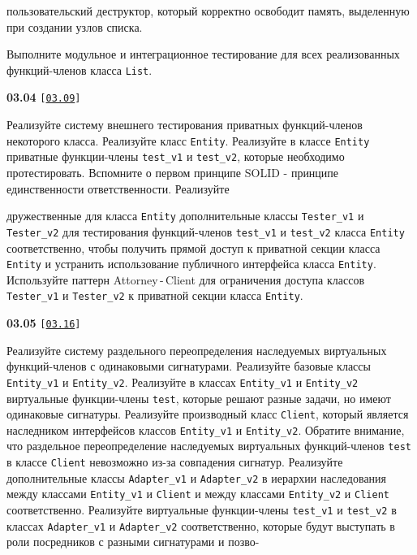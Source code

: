 \documentclass[a4paper,12pt]{article}
\begin{document}
пользовательский деструктор, который корректно освободит память, выделенную при создании узлов списка. 

Выполните модульное и интеграционное тестирование для всех реализованных функций-членов класса \lstinline{List}.

\bigskip

{\large \textbf{03.04} \texttt{[\href{https://github.com/i-s-m-mipt/Education/blob/master/projects/examples/source/03.09.cpp}{\texttt{03.09}}]}}

\bigskip

Реализуйте систему внешнего тестирования приватных функций-членов некоторого класса. Реализуйте класс \lstinline{Entity}. Реализуйте в классе \lstinline{Entity} приватные функции-члены \lstinline{test_v1} и \lstinline{test_v2}, которые необходимо протестировать. Вспомните о первом принципе SOLID - принципе единственности ответственности. Реализуйте 

дружественные для класса \lstinline{Entity} дополнительные классы \lstinline{Tester_v1} и \lstinline{Tester_v2} для тестирования функций-членов \lstinline{test_v1} и \lstinline{test_v2} класса \lstinline{Entity} соответственно, чтобы получить прямой доступ к приватной секции класса \lstinline{Entity} и устранить использование публичного интерфейса класса \lstinline{Entity}. Используйте паттерн Attorney\,-\,Client для ограничения доступа классов \lstinline{Tester_v1} и \lstinline{Tester_v2} к приватной секции класса \lstinline{Entity}.

\bigskip

{\large \textbf{03.05} \texttt{[\href{https://github.com/i-s-m-mipt/Education/blob/master/projects/examples/source/03.16.cpp}{\texttt{03.16}}]}}

\bigskip

Реализуйте систему раздельного переопределения наследуемых виртуальных функций-членов с одинаковыми сигнатурами. Реализуйте базовые классы \lstinline{Entity_v1} и \lstinline{Entity_v2}. Реализуйте в классах \lstinline{Entity_v1} и \lstinline{Entity_v2} виртуальные функции-члены \lstinline{test}, которые решают разные задачи, но имеют одинаковые сигнатуры. Реализуйте производный класс \lstinline{Client}, который является наследником интерфейсов классов \lstinline{Entity_v1} и \lstinline{Entity_v2}. Обратите внимание, что раздельное переопределение наследуемых виртуальных функций-членов \lstinline{test} в классе \lstinline{Client} невозможно из-за совпадения сигнатур. Реализуйте дополнительные классы \lstinline{Adapter_v1} и \lstinline{Adapter_v2} в иерархии наследования между классами \lstinline{Entity_v1} и \lstinline{Client} и между классами \lstinline{Entity_v2} и \lstinline{Client} соответственно. Реализуйте виртуальные функции-члены \lstinline{test_v1} и \lstinline{test_v2} в классах \lstinline{Adapter_v1} и \lstinline{Adapter_v2} соответственно, которые будут выступать в роли посредников с разными сигнатурами и позво- 
\end{document}

